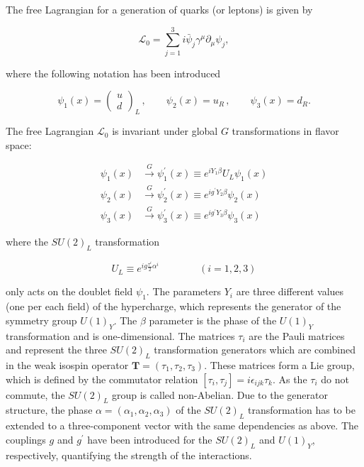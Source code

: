 The free Lagrangian for a generation of quarks (or leptons) is given by

\begin{equation}\label{eqn:SM_e12}
\mathcal{L}_0 = \sum_{j=1}^3 i\bar{\psi}_j\gamma^\mu\partial_\mu\psi_j,
\end{equation}

\noindent where the following notation has been introduced

\begin{equation}\label{eqn:SM_e13}
\psi_1(x) = 
\begin{pmatrix}
  u \\ d
\end{pmatrix}_L
\,
,
\qquad
\psi_2(x) = u_R \, , \qquad \psi_3(x) = d_R.
\end{equation}

The free Lagrangian $\mathcal{L}_0$ is invariant under global $G$ transformations in flavor space:

\begin{equation}\label{eqn:SM_e14}
\begin{split}
\psi_1(x) & \xrightarrow{G} \psi_1^\prime(x) \equiv e^{iY_1\beta}U_L\psi_1(x) \\ 
\psi_2(x) & \xrightarrow{G} \psi_2^\prime(x) \equiv e^{ig^\prime Y_2\beta}\psi_2(x) \\
\psi_3(x) & \xrightarrow{G} \psi_3^\prime(x) \equiv e^{ig^\prime Y_3\beta}\psi_3(x)
\end{split}
\end{equation}

\noindent where the $SU(2)_L$ transformation

\begin{equation}\label{eqn:SM_e15}
U_L \equiv e^{ig\frac{\tau^i}{2}\alpha^i} \qquad\qquad (i = 1,2,3)
\end{equation}

\noindent only acts on the doublet field $\psi_1$.
The parameters $Y_i$ are three different values (one per each field) of the hypercharge, which represents the generator of the symmetry group $U(1)_Y$.
The $\beta$ parameter is the phase of the $U(1)_Y$ transformation and is one-dimensional.
The matrices $\tau_i$ are the Pauli matrices and represent the three $SU(2)_L$ transformation generators which are combined in the weak isospin operator
$\textbf{T} = (\tau_1, \tau_2, \tau_3)$. These matrices form a Lie group, which is defined by the commutator relation $[\tau_i,\tau_j] = i\epsilon_{ijk}\tau_k$.
As the $\tau_i$ do not commute, the $SU(2)_L$ group is called non-Abelian.
Due to the generator structure, the phase $\alpha = (\alpha_1, \alpha_2, \alpha_3)$ of the $SU(2)_L$ transformation has to be extended to a three-component vector with the same dependencies as above.
The couplings $g$ and $g^\prime$ have been introduced for the $SU(2)_L$ and $U(1)_Y$, respectively, quantifying the strength of the interactions.

